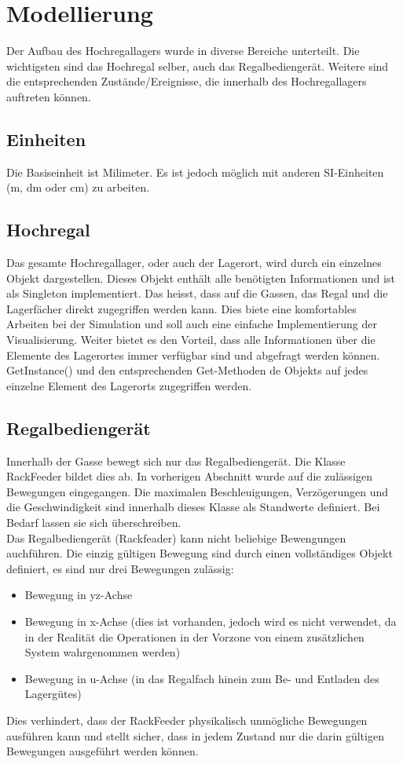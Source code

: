 \section{Modellierung}
Der Aufbau des Hochregallagers wurde in diverse Bereiche unterteilt. Die wichtigsten sind das Hochregal selber, auch das Regalbediengerät. Weitere sind die entsprechenden Zustände/Ereignisse, die innerhalb des Hochregallagers auftreten können. 
%
\subsection{Einheiten}
Die Basiseinheit ist Milimeter. Es ist jedoch möglich mit anderen SI-Einheiten (m, dm oder cm) zu arbeiten.
%
\subsection{Hochregal}
Das gesamte Hochregallager, oder auch der Lagerort, wird durch ein einzelnes Objekt dargestellen. Dieses Objekt enthält alle benötigten Informationen und ist als Singleton implementiert. Das heisst, dass auf die Gassen, das Regal und die Lagerfächer direkt zugegriffen werden kann. Dies biete eine komfortables Arbeiten bei der Simulation und soll auch eine einfache Implementierung der Visualisierung. Weiter bietet es den Vorteil, dass alle Informationen über die Elemente des Lagerortes immer verfügbar sind und abgefragt werden können. GetInstance() und den entsprechenden Get-Methoden de Objekts auf jedes einzelne Element des Lagerorts zugegriffen werden.
%
\subsection{Regalbediengerät}
Innerhalb der Gasse bewegt sich nur das Regalbediengerät. Die Klasse RackFeeder bildet dies ab. In vorherigen Abschnitt wurde auf die zulässigen Bewegungen eingegangen. Die maximalen Beschleuigungen, Verzögerungen und die Geschwindigkeit sind innerhalb dieses Klasse als Standwerte definiert. Bei Bedarf lassen sie sich überschreiben.\\
Das Regalbediengerät (Rackfeader) kann nicht beliebige Bewengungen auchführen. Die einzig gültigen Bewegung sind durch einen vollständiges Objekt definiert, es sind nur drei Bewegungen zulässig: 
%
\begin{itemize}
  \item Bewegung in yz-Achse
  \item Bewegung in x-Achse (dies ist vorhanden, jedoch wird es nicht verwendet, da in der Realität die Operationen in der Vorzone von einem zusätzlichen System wahrgenommen werden)
  \item Bewegung in u-Achse (in das Regalfach hinein zum Be- und Entladen des Lagergütes)
\end{itemize}
%
Dies verhindert, dass der RackFeeder physikalisch unmögliche Bewegungen ausführen kann und stellt sicher, dass in jedem Zustand nur die darin gültigen Bewegungen ausgeführt werden können.
%
